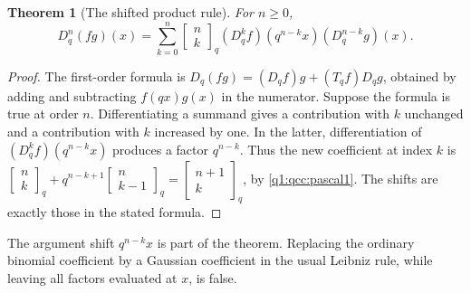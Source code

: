 \documentclass[11pt,a4paper,oneside,openany]{book}
\newtheorem{theorem}{Theorem}[chapter]
\theoremstyle{definition}
\theoremstyle{remark}
\newcommand{\GB}[3][q]{\begin{bmatrix}#2\\#3\end{bmatrix}_{#1}}
\begin{document}
\begin{theorem}[The shifted product rule]\label{q1:qcc:leibniz}
For \(n\ge0\),
\begin{equation}\label{q1:qcc:q-leibniz}
 D_q^n(fg)(x)=\sum_{k=0}^n\GB nk
 (D_q^k f)(q^{n-k}x)(D_q^{n-k}g)(x).
\end{equation}
\end{theorem}
\begin{proof}
The first-order formula is
\(D_q(fg)=(D_qf)g+(T_qf)D_qg\), obtained by adding and subtracting
\(f(qx)g(x)\) in the numerator. Suppose the formula is true at order \(n\).
Differentiating a summand gives a contribution with \(k\) unchanged and a
contribution with \(k\) increased by one. In the latter, differentiation of
\((D_q^kf)(q^{n-k}x)\) produces a factor \(q^{n-k}\).
Thus the new coefficient at index \(k\) is
\(\GB nk+q^{n-k+1}\GB n{k-1}=\GB{n+1}k\), by
\eqref{q1:qcc:pascal1}. The shifts are exactly those in the stated formula.
\end{proof}
\begin{auditbox}
The argument shift \(q^{n-k}x\) is part of the theorem. Replacing the ordinary
binomial coefficient by a Gaussian coefficient in the usual Leibniz rule, while
leaving all factors evaluated at \(x\), is false.
\end{auditbox}
\end{document}
